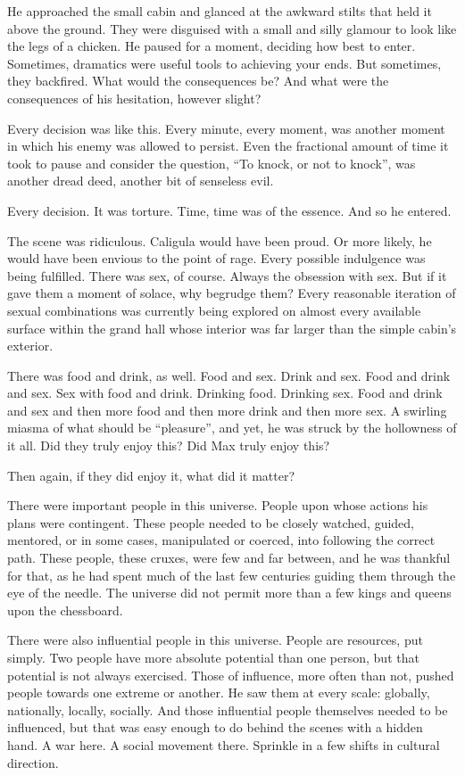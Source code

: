 He approached the small cabin and glanced at the awkward stilts that held it above the ground. They were disguised with a small and silly glamour to look like the legs of a chicken. He paused for a moment, deciding how best to enter. Sometimes, dramatics were useful tools to achieving your ends. But sometimes, they backfired. What would the consequences be? And what were the consequences of his hesitation, however slight?

Every decision was like this. Every minute, every moment, was another moment in which his enemy was allowed to persist. Even the fractional amount of time it took to pause and consider the question, “To knock, or not to knock”, was another dread deed, another bit of senseless evil.

Every decision. It was torture. Time, time was of the essence. And so he entered.

The scene was ridiculous. Caligula would have been proud. Or more likely, he would have been envious to the point of rage. Every possible indulgence was being fulfilled. There was sex, of course. Always the obsession with sex. But if it gave them a moment of solace, why begrudge them? Every reasonable iteration of sexual combinations was currently being explored on almost every available surface within the grand hall whose interior was far larger than the simple cabin’s exterior.

There was food and drink, as well. Food and sex. Drink and sex. Food and drink and sex. Sex with food and drink. Drinking food. Drinking sex. Food and drink and sex and then more food and then more drink and then more sex. A swirling miasma of what should be “pleasure”, and yet, he was struck by the hollowness of it all. Did they truly enjoy this? Did Max truly enjoy this?

Then again, if they did enjoy it, what did it matter?

There were important people in this universe. People upon whose actions his plans were contingent. These people needed to be closely watched, guided, mentored, or in some cases, manipulated or coerced, into following the correct path. These people, these cruxes, were few and far between, and he was thankful for that, as he had spent much of the last few centuries guiding them through the eye of the needle. The universe did not permit more than a few kings and queens upon the chessboard.

There were also influential people in this universe. People are resources, put simply. Two people have more absolute potential than one person, but that potential is not always exercised. Those of influence, more often than not, pushed people towards one extreme or another. He saw them at every scale: globally, nationally, locally, socially. And those influential people themselves needed to be influenced, but that was easy enough to do behind the scenes with a hidden hand. A war here. A social movement there. Sprinkle in a few shifts in cultural direction.

